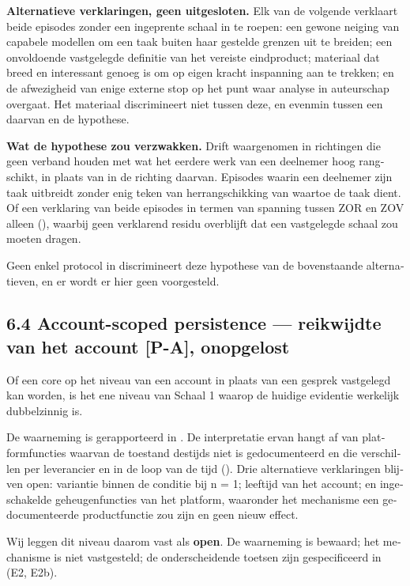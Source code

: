 \begin{dutch}
\textbf{Alternatieve verklaringen, geen uitgesloten.} Elk van de volgende verklaart beide episodes zonder een ingeprente schaal in te roepen: een gewone neiging van capabele modellen om een taak buiten haar gestelde grenzen uit te breiden; een onvoldoende vastgelegde definitie van het vereiste eindproduct; materiaal dat breed en interessant genoeg is om op eigen kracht inspanning aan te trekken; en de afwezigheid van enige externe stop op het punt waar analyse in auteurschap overgaat. Het materiaal discrimineert niet tussen deze, en evenmin tussen een daarvan en de hypothese.

\textbf{Wat de hypothese zou verzwakken.} Drift waargenomen in richtingen die geen verband houden met wat het eerdere werk van een deelnemer hoog rangschikt, in plaats van in de richting daarvan. Episodes waarin een deelnemer zijn taak uitbreidt zonder enig teken van herrangschikking van waartoe de taak dient. Of een verklaring van beide episodes in termen van spanning tussen ZOR en ZOV alleen (), waarbij geen verklarend residu overblijft dat een vastgelegde schaal zou moeten dragen.

Geen enkel protocol in  discrimineert deze hypothese van de bovenstaande alternatieven, en er wordt er hier geen voorgesteld.


\subsection*{6.4 Account-scoped persistence — reikwijdte van het account \textbf{[P-A]}, onopgelost}
\label{sec:nl:6.4}

Of een core op het niveau van een account in plaats van een gesprek vastgelegd kan worden, is het ene niveau van Schaal 1 waarop de huidige evidentie werkelijk dubbelzinnig is.

De waarneming is gerapporteerd in . De interpretatie ervan hangt af van platformfuncties waarvan de toestand destijds niet is gedocumenteerd en die verschillen per leverancier en in de loop van de tijd (). Drie alternatieve verklaringen blijven open: variantie binnen de conditie bij n = 1; leeftijd van het account; en ingeschakelde geheugenfuncties van het platform, waaronder het mechanisme een gedocumenteerde productfunctie zou zijn en geen nieuw effect.

Wij leggen dit niveau daarom vast als \textbf{open}. De waarneming is bewaard; het mechanisme is niet vastgesteld; de onderscheidende toetsen zijn gespecificeerd in  (E2, E2b).



\end{dutch}
